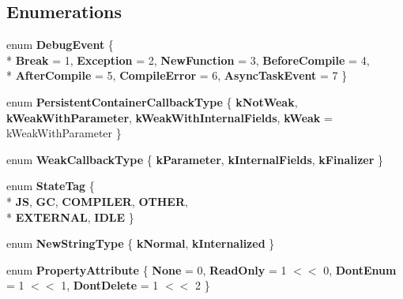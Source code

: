 \subsection*{Enumerations}
\begin{DoxyCompactItemize}
\item 
enum {\bfseries Debug\+Event} \{ \\*
{\bfseries Break} = 1, 
{\bfseries Exception} = 2, 
{\bfseries New\+Function} = 3, 
{\bfseries Before\+Compile} = 4, 
\\*
{\bfseries After\+Compile} = 5, 
{\bfseries Compile\+Error} = 6, 
{\bfseries Async\+Task\+Event} = 7
 \}\hypertarget{namespacev8_a4157e857c3767e2b82686a53ae3da853}{}\label{namespacev8_a4157e857c3767e2b82686a53ae3da853}

\item 
enum {\bfseries Persistent\+Container\+Callback\+Type} \{ {\bfseries k\+Not\+Weak}, 
{\bfseries k\+Weak\+With\+Parameter}, 
{\bfseries k\+Weak\+With\+Internal\+Fields}, 
{\bfseries k\+Weak} = k\+Weak\+With\+Parameter
 \}\hypertarget{namespacev8_ad2a33b8f8a1701a800a691dd025f7dde}{}\label{namespacev8_ad2a33b8f8a1701a800a691dd025f7dde}

\item 
enum {\bfseries Weak\+Callback\+Type} \{ {\bfseries k\+Parameter}, 
{\bfseries k\+Internal\+Fields}, 
{\bfseries k\+Finalizer}
 \}\hypertarget{namespacev8_a68b2b90003e18980bc0b438c95be1005}{}\label{namespacev8_a68b2b90003e18980bc0b438c95be1005}

\item 
enum {\bfseries State\+Tag} \{ \\*
{\bfseries JS}, 
{\bfseries GC}, 
{\bfseries C\+O\+M\+P\+I\+L\+ER}, 
{\bfseries O\+T\+H\+ER}, 
\\*
{\bfseries E\+X\+T\+E\+R\+N\+AL}, 
{\bfseries I\+D\+LE}
 \}\hypertarget{namespacev8_adb1bd0f9ef7cc084b6a94a5e1b420f69}{}\label{namespacev8_adb1bd0f9ef7cc084b6a94a5e1b420f69}

\item 
enum {\bfseries New\+String\+Type} \{ {\bfseries k\+Normal}, 
{\bfseries k\+Internalized}
 \}\hypertarget{namespacev8_ac9163ab12fb3b2a95907a3a0367c6095}{}\label{namespacev8_ac9163ab12fb3b2a95907a3a0367c6095}

\item 
enum {\bfseries Property\+Attribute} \{ {\bfseries None} = 0, 
{\bfseries Read\+Only} = 1 $<$$<$ 0, 
{\bfseries Dont\+Enum} = 1 $<$$<$ 1, 
{\bfseries Dont\+Delete} = 1 $<$$<$ 2
 \}\hypertarget{namespacev8_a05f25f935e108a1ea2d150e274602b87}{}\label{namespacev8_a05f25f935e108a1ea2d150e274602b87}


\end{DoxyCompactItemize}

